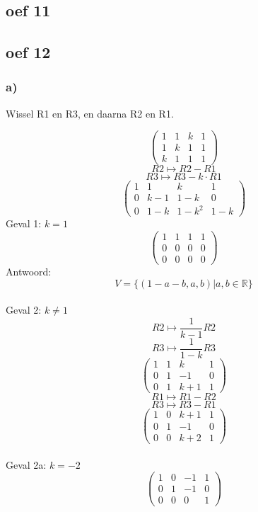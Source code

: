 \documentclass[10pt,a4paper]{article}
\begin{document}
\subsection*{oef 11}

\subsection*{oef 12}
\subsubsection*{a)}
\begin{center}
Wissel R1 en R3, en daarna R2 en R1.
\end{center}
\[
\begin{pmatrix}
1 &  1 &  k & 1\\
1 &  k &  1 & 1\\
k &  1 &  1 & 1
\end{pmatrix}
\]
\[ R2 \longmapsto R2 - R1\]
\[ R3 \longmapsto R3 - k \cdot	R1\]
\[
\begin{pmatrix}
1 &  1 &  k & 1\\
0 & k-1& 1-k& 0\\
0 & 1-k & 1-k^2 & 1-k
\end{pmatrix}
\]
Geval 1: $k=1$
\[
\begin{pmatrix}
1 &  1 & 1 & 1\\
0 &  0 & 0 & 0\\
0 &  0 & 0 & 0
\end{pmatrix}
\]
Antwoord:
\[
V=\{ (1-a-b,a,b) | a,b \in \mathbb{R}\}
\]\\
Geval 2: $k\neq 1$\\ 
\[ R2 \longmapsto \frac{1}{k-1}R2\]
\[ R3 \longmapsto \frac{1}{1-k}R3\]
\[
\begin{pmatrix}
1 &  1 &  k & 1\\
0 &  1 & -1 & 0\\
0 &  1 & k+1& 1
\end{pmatrix}
\]
\[ R1 \longmapsto R1-R2\]
\[ R3 \longmapsto R3-R1\]
\[
\begin{pmatrix}
1 &  0 &  k+1 & 1\\
0 &  1 & -1 & 0\\
0 &  0 & k+2& 1
\end{pmatrix}
\]\\
Geval 2a: $k = -2$\\
\[
\begin{pmatrix}
1 &  0 & -1 & 1\\
0 &  1 & -1 & 0\\
0 &  0 &  0 & 1
\end{pmatrix}
\]
\end{document}
